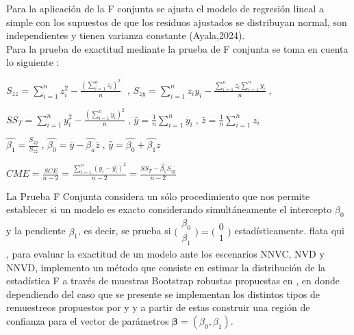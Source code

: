 Para la aplicación de la F conjunta se ajusta el modelo de regresión lineal a simple con los supuestos de que los residuos ajustados se distribuyan normal, son independientes y tienen varianza constante (Ayala,2024).\\

Para la prueba de exactitud mediante la prueba de F conjunta se toma en cuenta lo siguiente \parencite{montgomery-2012}: 

\begin{center}
	$S_{zz} = \sum_{i=1}^{n}z_{i}^{2} - \frac{( \sum_{i=1}^{n} z_{i})^{2}}{n} \;$ ,
	$S_{zy} = \sum_{i=1}^{n}z_{i} y_{i} - \frac{ \sum_{i=1}^{n} z_{i} \sum_{i=1}^{n} y_{i} }{n} \;$,\\
\end{center}

\begin{center}
	$SS_{T} = \sum_{i=1}^{n}y_{i}^{2} - \frac{( \sum_{i=1}^{n} y_{i})^{2}}{n} \;$, $\bar{y} = \frac{1}{n} \sum_{i=1}^{n} y_{i} \; $, $\bar{z} = \frac{1}{n} \sum_{i=1}^{n} z_{i} $ \\
\end{center}


\begin{center}
	$ \hat{\beta_{1}} = \frac{S_{zy}}{S_{zz}}  \;$, $\hat{\beta_{0}} =  \bar{y} - \hat{\beta_{a}} \bar{z}  \; $, $\hat{y} = \hat{\beta_{0}}  + \hat{\beta_{1}}z $ \\
\end{center}

\begin{center}
	$ CME =  \frac{SCE}{n-2} = \frac{ \sum_{i=1}^{n} (y_{i} - \hat{y_{i}} )^{2} }{n - 2 } =  \frac{SS_{T} - \hat{\beta_{1}} S_{zy}}{n -2} $ \\
\end{center}


La Prueba F Conjunta considera un sólo procedimiento que nos permite establecer si un modelo es exacto considerando simultáneamente el intercepto \(\beta_0\) y la pendiente \(\beta_1\), es decir, se prueba si $\bigl(\begin{smallmatrix} \beta_{0} \\ \beta_{1} \end{smallmatrix}\bigr) = \bigl(\begin{smallmatrix}0  \\  1\end{smallmatrix}\bigr) $ estadísticamente. flata qui \\

\textcite{zacarias-2023}, para evaluar la exactitud de un modelo ante los escenarios NNVC, NVD y NNVD, implemento un método que consiste en estimar la distribución de la estadística F a través de muestras Bootstrap robustas propuestas en \textcite{rana-2012}, en donde dependiendo del caso que se presente se implementan los distintos tipos de remuestreos propuestos por \textcite{wu-1986} y \textcite{liu-1988} y a partir de estas construir una región de confianza para el vector de parámetros $ \mathbf{\beta} = (\beta_{0}, \beta_{1})$.\\


